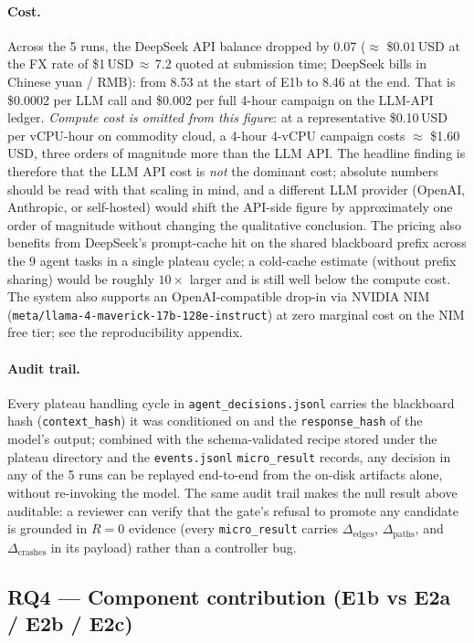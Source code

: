 \documentclass[11pt]{article}
\newcommand{\nimmodeid}{\texttt{meta/\allowbreak{}llama-4-\allowbreak{}maverick-\allowbreak{}17b-\allowbreak{}128e-\allowbreak{}instruct}}
\begin{document}
\paragraph{Cost.}
Across the 5 runs, the DeepSeek API balance dropped by
\textyen{}0.07 ($\approx$ \$0.01\,USD at the FX rate of
\$1\,USD\,$\approx$\,\textyen{}7.2 quoted at submission time;
DeepSeek bills in Chinese yuan / RMB): from \textyen{}8.53 at
the start of E1b to \textyen{}8.46 at the end. That is
\$0.0002 per LLM call and \$0.002 per full 4-hour
campaign on the LLM-API ledger. \emph{Compute cost is
omitted from this figure}: at a representative \$0.10\,USD per
vCPU-hour on commodity cloud, a 4-hour 4-vCPU campaign costs
$\approx$ \$1.60\,USD, three orders of magnitude more than the
LLM API. The headline finding is therefore that the LLM API
cost is \emph{not} the dominant cost; absolute numbers should be
read with that scaling in mind, and a different LLM provider
(OpenAI, Anthropic, or self-hosted) would shift the API-side
figure by approximately one order of magnitude without changing
the qualitative conclusion. The pricing also benefits from
DeepSeek's prompt-cache hit on the shared blackboard prefix
across the 9 agent tasks in a single plateau cycle; a cold-cache
estimate (without prefix sharing) would be roughly $10\times$
larger and is still well below the compute cost. The system also
supports an OpenAI-compatible drop-in via NVIDIA NIM
(\nimmodeid{}) at zero
marginal cost on the NIM free tier; see the reproducibility
appendix.

\paragraph{Audit trail.}
Every plateau handling cycle in
\texttt{agent\_decisions.jsonl} carries the blackboard hash
(\texttt{context\_hash}) it was conditioned on and the
\texttt{response\_hash} of the model's output; combined with the
schema-validated recipe stored under the plateau directory and the
\texttt{events.jsonl} \texttt{micro\_result} records, any decision
in any of the 5 runs can be replayed end-to-end from the on-disk
artifacts alone, without re-invoking the model. The same audit
trail makes the null result above auditable: a reviewer can verify
that the gate's refusal to promote any candidate is grounded in
$R{=}0$ evidence (every \texttt{micro\_result} carries
$\Delta_{\text{edges}}$, $\Delta_{\text{paths}}$, and
$\Delta_{\text{crashes}}$ in its payload) rather than a controller
bug.

\subsection{RQ4 --- Component contribution
  (E1b vs E2a / E2b / E2c)}
\label{sec:eval:rq4-ablation}
\end{document}
